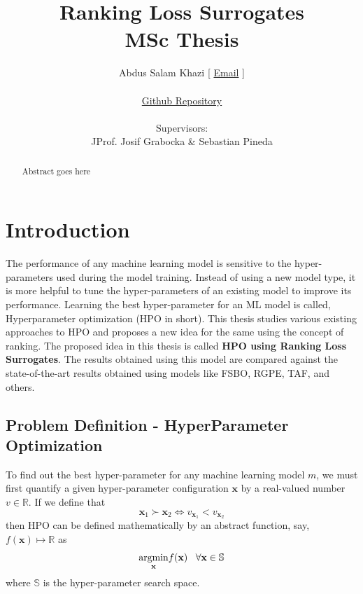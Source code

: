 \documentclass[11pt]{report}
\title {Ranking Loss Surrogates \\[1ex] \large MSc Thesis}
\author{
        Abdus Salam Khazi [
        \href{mailto:abdus.khazi@students.uni-freiburg.de}
                {Email} ]\\ \\
        \href{https://github.com/abduskhazi/ranking-loss-surrogates.git}
                {Github Repository} \cite{github_repository} \\ \\
        Supervisors:
        \begin{tabular}{ll}
             JProf. Josif Grabocka \&
			Sebastian Pineda
		\end{tabular}
       }
\begin{document}


\maketitle
\date{}

\newpage
{}
\begin{abstract}

Abstract goes here

\end{abstract}

\newpage

\tableofcontents
\newpage
\newpage


\chapter{Introduction}

The performance of any machine learning model is sensitive to the hyper-parameters used during the model training. 
Instead of using a new model type, it is more helpful to tune the hyper-parameters of an existing model to improve its performance.
Learning the best hyper-parameter for an ML model is called, Hyperparameter optimization (HPO in short).
This thesis studies various existing approaches to HPO and proposes a new idea for the same using the concept of ranking.
The proposed idea in this thesis is called \textbf{HPO using Ranking Loss Surrogates}. 
The results obtained using this model are compared against the state-of-the-art results obtained using models like FSBO,  RGPE,  TAF, and others. 

\section{Problem Definition - HyperParameter Optimization}
To find out the best hyper-parameter for any machine learning model $m$, we must first quantify a given hyper-parameter configuration $\textbf{x}$ by a real-valued number $v \in \mathbb{R}$.
If we define that
$$
\textbf{x}_1 \succ  \textbf{x}_2 \iff v_{\textbf{x}_1} < v_{\textbf{x}_2}
$$
then HPO can be defined mathematically by an abstract function, say,  $f(\textbf{x}) \mapsto \mathbb{R}$ as
$$
     \underset{\rm \textbf{x}}{\rm argmin}  f(\textbf{x}) \;\;\;  \forall \textbf{x} \in \mathbb{S}
$$
where $\mathbb{S}$ is the hyper-parameter search space.
\end{document}
